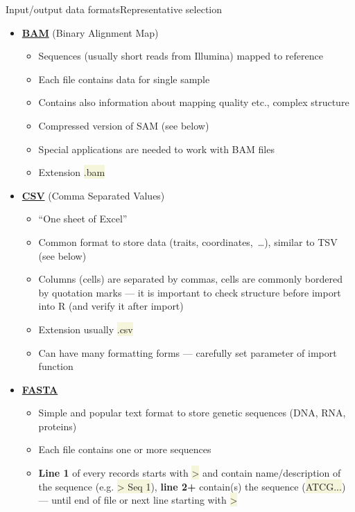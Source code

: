 \documentclass[compress, xelatex, 11pt, xcolor=svgnames, aspectratio=169,
	hyperref={
		bookmarks=true,
		unicode=true,
		colorlinks=true,
		pdftitle={Molecular data in R},
		plainpages=false,
		pdfauthor={Vojtech Zeisek},
		pdfsubject={Course about phylogeny and evolution in R},
		pdfcreator={XeLaTeX},
		pdfkeywords={R, evolution, phylogeny, molecular data},
		linkcolor=Crimson, %
		anchorcolor=Magenta, %
		citecolor=Magenta, %
		filecolor=Magenta, %
		menucolor=Magenta, %
		urlcolor=DodgerBlue, %
		},
	url={hyphens, lowtilde} %
	]{beamer}
\renewcommand{\texttt}[1]{\colorbox{Beige}{{\ttfamily #1}}}
\begin{document}
\begin{frame}[allowframebreaks]{Input/output data formats}{Representative selection}
	\begin{itemize}
		\item \href{https://en.wikipedia.org/wiki/Binary_Alignment_Map}{\textbf{BAM}} (Binary Alignment Map)
		\begin{itemize}
			\item Sequences (usually short reads from Illumina) mapped to reference
			\item Each file contains data for single sample
			\item Contains also information about mapping quality etc., complex structure
			\item Compressed version of SAM (see below)
			\item Special applications are needed to work with BAM files
			\item Extension \texttt{*.bam}
		\end{itemize}
		\item \href{https://en.wikipedia.org/wiki/Comma-separated_values}{\textbf{CSV}} (Comma Separated Values)
		\begin{itemize}
			\item \enquote{One sheet of Excel}
			\item Common format to store data (traits, coordinates,~\ldots), similar to TSV (see below)
			\item Columns (cells) are separated by commas, cells are commonly bordered by quotation marks --- it is important to check structure before import into R (and verify it after import)
			\item Extension usually \texttt{*.csv}
			\item Can have many formatting forms --- carefully set parameter of import function
		\end{itemize}
		\item \href{https://en.wikipedia.org/wiki/FASTA_format}{\textbf{FASTA}}
		\begin{itemize}
			\item Simple and popular text format to store genetic sequences (DNA, RNA, proteins)
			\item Each file contains one or more sequences
			\item \textbf{Line 1} of every records starts with \texttt{>} and contain name/description of the sequence (e.g. \texttt{> Seq 1}), \textbf{line 2+} contain(s) the sequence (\texttt{ATCG...}) --- until end of file or next line starting with \texttt{>}

\end{itemize}
\end{itemize}
\end{frame}
\end{document}
